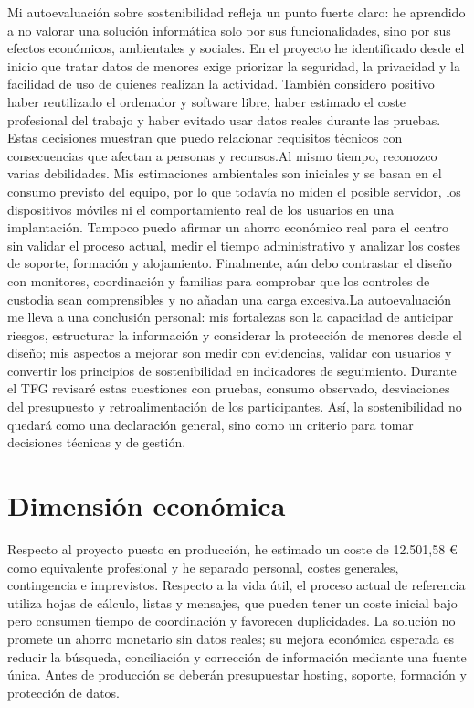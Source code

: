 Mi autoevaluación sobre sostenibilidad refleja un punto fuerte claro: he aprendido a no valorar una solución informática solo por sus funcionalidades, sino por sus efectos económicos, ambientales y sociales. En el proyecto he identificado desde el inicio que tratar datos de menores exige priorizar la seguridad, la privacidad y la facilidad de uso de quienes realizan la actividad. También considero positivo haber reutilizado el ordenador y software libre, haber estimado el coste profesional del trabajo y haber evitado usar datos reales durante las pruebas. Estas decisiones muestran que puedo relacionar requisitos técnicos con consecuencias que afectan a personas y recursos.\newline \newline Al mismo tiempo, reconozco varias debilidades. Mis estimaciones ambientales son iniciales y se basan en el consumo previsto del equipo, por lo que todavía no miden el posible servidor, los dispositivos móviles ni el comportamiento real de los usuarios en una implantación. Tampoco puedo afirmar un ahorro económico real para el centro sin validar el proceso actual, medir el tiempo administrativo y analizar los costes de soporte, formación y alojamiento. Finalmente, aún debo contrastar el diseño con monitores, coordinación y familias para comprobar que los controles de custodia sean comprensibles y no añadan una carga excesiva.\newline \newline La autoevaluación me lleva a una conclusión personal: mis fortalezas son la capacidad de anticipar riesgos, estructurar la información y considerar la protección de menores desde el diseño; mis aspectos a mejorar son medir con evidencias, validar con usuarios y convertir los principios de sostenibilidad en indicadores de seguimiento. Durante el TFG revisaré estas cuestiones con pruebas, consumo observado, desviaciones del presupuesto y retroalimentación de los participantes. Así, la sostenibilidad no quedará como una declaración general, sino como un criterio para tomar decisiones técnicas y de gestión.

\section{Dimensión económica}\label{sec:5-3}

Respecto al proyecto puesto en producción, he estimado un coste de 12.501,58 € como equivalente profesional y he separado personal, costes generales, contingencia e imprevistos. Respecto a la vida útil, el proceso actual de referencia utiliza hojas de cálculo, listas y mensajes, que pueden tener un coste inicial bajo pero consumen tiempo de coordinación y favorecen duplicidades. La solución no promete un ahorro monetario sin datos reales; su mejora económica esperada es reducir la búsqueda, conciliación y corrección de información mediante una fuente única. Antes de producción se deberán presupuestar hosting, soporte, formación y protección de datos.

